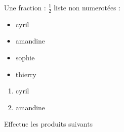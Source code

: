\documentclass{article} %
\begin{document}
    Une fraction : \(\frac{1}{2}\)
    liste non numerotées :
    \begin{itemize}
        \item cyril
        \item amandine
        \item sophie
        \item thierry
    \end{itemize}
    \begin{enumerate}
        \item cyril
        \item amandine
    \end{enumerate}
    \begin{exercise}
        Effectue les produits suivants
    \end{exercise}
\end{document}
